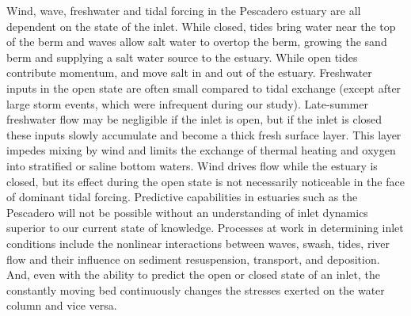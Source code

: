 Wind, wave, freshwater and tidal forcing in the Pescadero estuary are all dependent on the state of the inlet.  While closed, tides bring water near the top of the berm and waves allow salt water to overtop the berm, growing the sand berm and supplying a salt water source to the estuary. While open tides contribute momentum, and move salt in and out of the estuary. Freshwater inputs in the open state are often small compared to tidal exchange (except after large storm events, which were infrequent during our study). Late-summer freshwater flow may be negligible if the inlet is open, but if the inlet is closed these inputs slowly accumulate and become a thick fresh surface layer. This layer impedes mixing by wind and limits the exchange of thermal heating and oxygen into stratified or saline bottom waters. Wind drives flow while the estuary is closed, but its effect during the open state is not necessarily noticeable in the face of dominant tidal forcing. Predictive capabilities in estuaries such as the Pescadero will not be possible without an understanding of inlet dynamics superior to our current state of knowledge.  Processes at work in determining inlet conditions include the nonlinear interactions between waves, swash, tides, river flow and their influence on sediment resuspension, transport, and deposition. And, even with the ability to predict the open or closed state of an inlet, the constantly moving bed continuously changes the stresses exerted on the water column and vice versa. 